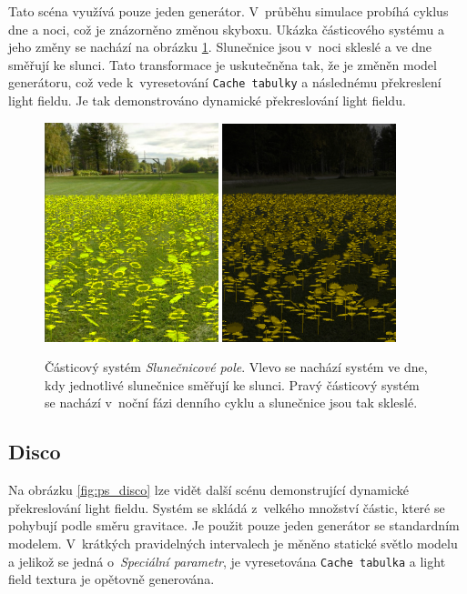 Tato scéna využívá pouze jeden generátor. V~průběhu simulace probíhá cyklus dne a noci, což je znázorněno změnou skyboxu. Ukázka částicového systému a jeho změny se nachází na obrázku \ref{fig:ps_slunecnice}. Slunečnice jsou v~noci skleslé a ve dne směřují ke slunci. Tato transformace je uskutečněna tak, že je změněn model generátoru, což vede k~vyresetování \texttt{Cache tabulky} a následnému překreslení light fieldu. Je tak demonstrováno dynamické překreslování light fieldu.
\begin{figure}[H]
	\centering
	\includegraphics[width=0.45\textwidth]{obrazky-figures/slunecnice_den.png}
	\includegraphics[width=0.45\textwidth]{obrazky-figures/slunecnice_noc.png}
	\caption{Částicový systém \emph{Slunečnicové pole}. Vlevo se nachází systém ve dne, kdy jednotlivé slunečnice směřují ke slunci. Pravý částicový systém se nachází v~noční fázi denního cyklu a slunečnice jsou tak skleslé. }
	\label{fig:ps_slunecnice}
\end{figure}

\subsection*{Disco}
Na obrázku \ref{fig:ps_disco} lze vidět další scénu demonstrující dynamické překreslování light fieldu. Systém se skládá z~velkého množství částic, které se pohybují podle směru gravitace. Je použit pouze jeden generátor se standardním modelem. V~krátkých pravidelných intervalech je měněno statické světlo modelu a jelikož se jedná o~\emph{Speciální parametr}, je vyresetována \texttt{Cache tabulka} a light field textura je opětovně generována. 

